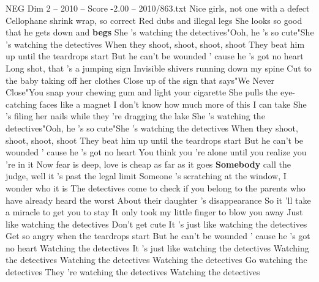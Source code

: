 \begin{textsample}{NEG Dim 2 – 2010 – Score -2.00 – 2010/863.txt}  \label{ex:f2_neg_008}
Nice girls, not one with a defect Cellophane shrink wrap, so correct Red dubs and illegal legs She looks so good that he gets down and \textbf{begs} She 's watching the detectives"Ooh, he 's so cute"She 's watching the detectives When they shoot, shoot, shoot, shoot They beat him up until the teardrops start But he can't be wounded ' cause he 's got no heart Long shot, that 's a jumping sign Invisible shivers running down my spine Cut to the baby taking off her clothes Close up of the sign that says"We Never Close"You snap your chewing gum and light your cigarette She pulls the eye-catching faces like a magnet I don't know how much more of this I can take She 's filing her nails while they 're dragging the lake She 's watching the detectives"Ooh, he 's so cute"She 's watching the detectives When they shoot, shoot, shoot, shoot They beat him up until the teardrops start But he can't be wounded ' cause he 's got no heart You think you 're alone until you realize you 're in it Now fear is deep, love is cheap as far as it goes \textbf{Somebody} call the judge, well it 's past the legal limit Someone 's scratching at the window, I wonder who it is The detectives come to check if you belong to the parents who have already heard the worst About their daughter 's disappearance So it 'll take a miracle to get you to stay It only took my little finger to blow you away Just like watching the detectives Don't get cute It 's just like watching the detectives Get so angry when the teardrops start But he can't be wounded ' cause he 's got no heart Watching the detectives It 's just like watching the detectives Watching the detectives Watching the detectives Watching the detectives Go watching the detectives They 're watching the detectives Watching the detectives

\end{textsample}
